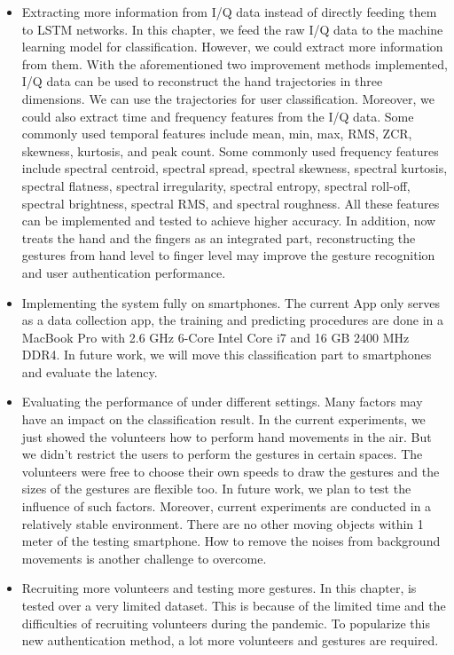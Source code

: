 \begin{itemize}
	\item Extracting more information from I/Q data instead of directly feeding them to LSTM networks. In this chapter, we feed the raw I/Q data to the machine learning model for classification. However, we could extract more information from them. With the aforementioned two improvement methods implemented, I/Q data can be used to reconstruct the hand trajectories in three dimensions. We can use the trajectories for user classification. Moreover, we could also extract time and frequency features from the I/Q data. Some commonly used temporal features include mean, min, max, RMS, ZCR, skewness, kurtosis, and peak count. Some commonly used frequency features include spectral centroid, spectral spread, spectral skewness, spectral kurtosis, spectral flatness, spectral irregularity, spectral entropy, spectral roll-off,	spectral brightness, 
	spectral RMS, and spectral roughness. All these features can be implemented and tested to achieve higher accuracy. In addition, {\uu} now treats the hand and the fingers as an integrated part, reconstructing the gestures from hand level to finger level may improve the gesture recognition and user authentication performance.
	
	\item Implementing the system fully on smartphones. The current {\uu}App only serves as a data collection app, the training and predicting procedures are done in a MacBook Pro with 2.6 GHz 6-Core Intel Core i7 and 16 GB 2400 MHz DDR4. In future work, we will move this classification part to smartphones and evaluate the latency.
	
	
	\item Evaluating the performance of {\uu} under different settings. Many factors may have an impact on the classification result. In the current experiments, we just showed the volunteers how to perform hand movements in the air. But we didn't restrict the users to perform the gestures in certain spaces. The volunteers were free to choose their own speeds to draw the gestures and the sizes of the gestures are flexible too. In future work, we plan to test the influence of such factors. Moreover, current experiments are conducted in a relatively stable environment. There are no other moving objects within 1 meter of the testing smartphone. How to remove the noises from background movements is another challenge to overcome.
	
	
	\item Recruiting more volunteers and testing more gestures. In this chapter, {\uu} is tested over a very limited dataset. This is because of the limited time and the difficulties of recruiting volunteers during the pandemic. To popularize this new authentication method, a lot more volunteers and gestures are required. 
	
\end{itemize}



